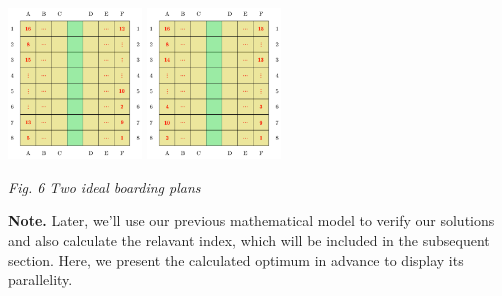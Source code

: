 \documentclass{article}
\theoremstyle{definition}
\theoremstyle{remark}
\numberwithin{equation}{section}
\begin{document}
	\begin{center}
		\includegraphics[height =4cm]{steffen1.jpg}
		\includegraphics[height = 4cm]{steffen2.jpg}

		\small\textit{Fig. 6 Two ideal boarding plans}
	\end{center}

	\textbf{Note. }Later, we'll use our previous mathematical model to verify our solutions and also calculate the relavant  index, which will be included in the subsequent section. Here, we present the calculated optimum in advance to display its parallelity.
\end{document}
